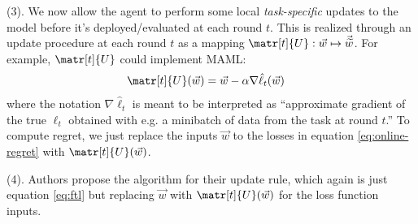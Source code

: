 \documentclass[11pt]{article}
\begin{document}
 (3). We now allow the agent to perform some local \textit{task-specific} updates to the model before it's deployed/evaluated at each round $t$. This is realized through an update procedure at each round $t$ as a mapping $\matr[t]{U} : \vec w \mapsto \vec{\widetilde w}$. For example, $\matr[t]{U}$ could implement MAML:
\begin{align}
	\matr[t]{U}(\vec w)	
		&= \vec w  - \alpha \nabla \hat\ell_t (\vec w)
\end{align}
where the notation $ \nabla \hat\ell_t$ is meant to be interpreted as ``approximate gradient of the true $\ell_t$ obtained with e.g. a minibatch of data from the task at round $t$.'' To compute regret, we just replace the inputs $\vec w$ to the losses in equation \ref{eq:online-regret} with $\matr[t]{U}(\vec w)$.

 (4). Authors propose the  algorithm for their update rule, which again is just equation \ref{eq:ftl} but replacing $\vec w$ with $\matr[t]{U}(\vec w)$ for the loss function inputs. 






\end{document}

